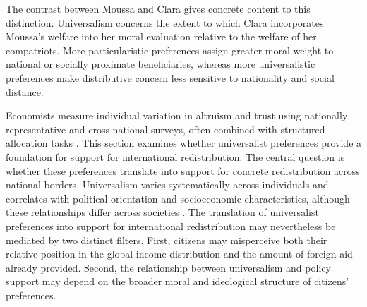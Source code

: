 \documentclass[11pt,a4paper]{article}
\begin{document}
The contrast between Moussa and Clara gives concrete content to this distinction. Universalism concerns the extent to which Clara incorporates Moussa's welfare into her moral evaluation relative to the welfare of her compatriots. More particularistic preferences assign greater moral weight to national or socially proximate beneficiaries, whereas more universalistic preferences make distributive concern less sensitive to nationality and social distance.

Economists measure individual variation in altruism and trust using nationally representative and cross-national surveys, often combined with structured allocation tasks \citep{cappelen_universalism_2025,enke_moral_2023}. This section examines whether universalist preferences provide a foundation for support for international redistribution. 
The central question is whether these preferences translate into support for concrete redistribution across national borders. %
Universalism varies systematically across individuals and correlates with political orientation and socioeconomic characteristics, although these relationships differ across societies \citep{cappelen_universalism_2025,enke_moral_2023}. %
The translation of universalist preferences into support for international redistribution may nevertheless be mediated by two distinct filters. First, citizens may misperceive both their relative position in the global income distribution and the amount of foreign aid already provided. Second, the relationship between universalism and policy support may depend on the broader moral and ideological structure of citizens' preferences.
\end{document}
